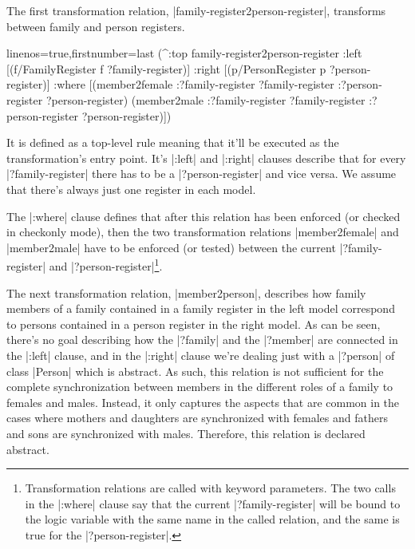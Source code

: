 \documentclass[a4paper]{article}
\newcommand{\code}{\clojureinline}
\begin{document}
The first transformation relation, \code|family-register2person-register|,
transforms between family and person registers.

\begin{clojurecode*}{linenos=true,firstnumber=last}
  (^:top family-register2person-register
   :left  [(f/FamilyRegister f ?family-register)]
   :right [(p/PersonRegister p ?person-register)]
   :where [(member2female :?family-register ?family-register
                          :?person-register ?person-register)
           (member2male :?family-register ?family-register
                        :?person-register ?person-register)])
\end{clojurecode*}

It is defined as a top-level rule meaning that it'll be executed as the
transformation's entry point.  It's \code|:left| and \code|:right| clauses
describe that for every \code|?family-register| there has to be a
\code|?person-register| and vice versa.  We assume that there's always just one
register in each model.

The \code|:where| clause defines that after this relation has been enforced (or
checked in checkonly mode), then the two transformation relations
\code|member2female| and \code|member2male| have to be enforced (or tested)
between the current \code|?family-register| and
\code|?person-register|\footnote{Transformation relations are called with
  keyword parameters.  The two calls in the \code|:where| clause say that the
  current \code|?family-register| will be bound to the logic variable with the
  same name in the called relation, and the same is true for the
  \code|?person-register|.}.

The next transformation relation, \code|member2person|, describes how family
members of a family contained in a family register in the left model correspond
to persons contained in a person register in the right model.  As can be seen,
there's no goal describing how the \code|?family| and the \code|?member| are
connected in the \code|:left| clause, and in the \code|:right| clause we're
dealing just with a \code|?person| of class \code|Person| which is abstract.
As such, this relation is not sufficient for the complete synchronization
between members in the different roles of a family to females and males.
Instead, it only captures the aspects that are common in the cases where
mothers and daughters are synchronized with females and fathers and sons are
synchronized with males.  Therefore, this relation is declared abstract.
\end{document}
